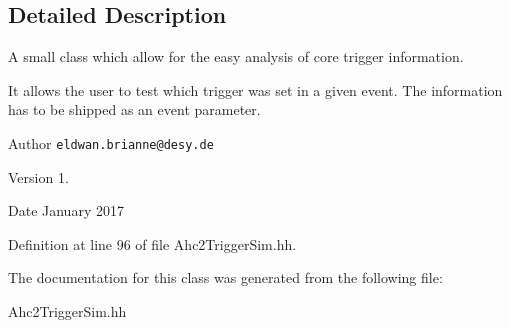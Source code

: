 \subsection{Detailed Description}
A small class which allow for the easy analysis of core trigger information. 

It allows the user to test which trigger was set in a given event. The information has to be shipped as an event parameter. \begin{DoxyAuthor}{Author}
{\tt eldwan.\-brianne@desy.\-de} 
\end{DoxyAuthor}
\begin{DoxyVersion}{Version}
1. 
\end{DoxyVersion}
\begin{DoxyDate}{Date}
January 2017 
\end{DoxyDate}


Definition at line 96 of file Ahc2\-Trigger\-Sim.\-hh.



The documentation for this class was generated from the following file\-:\begin{DoxyCompactItemize}
\item 
Ahc2\-Trigger\-Sim.\-hh\end{DoxyCompactItemize}
